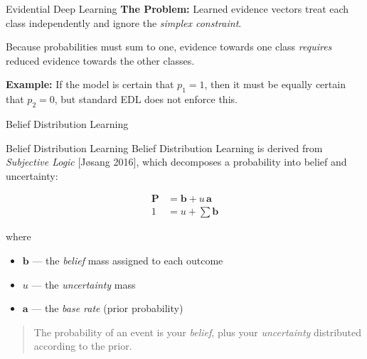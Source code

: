 \documentclass[aspectratio=169]{beamer}
\begin{document}
\begin{frame}[t]{Evidential Deep Learning}
    \textbf{The Problem:} Learned evidence vectors treat each class independently and ignore the \emph{simplex constraint}.
    
    \vspace{2em}
    
    Because probabilities must sum to one, evidence towards one class \emph{requires} reduced evidence towards the other classes.
    
    \vspace{0.5em}
    
    \textbf{Example:} If the model is certain that $p_1 = 1$, then it must be equally certain that $p_2 = 0$, but standard EDL does not enforce this.
\end{frame}

\begin{frame}[T]
    \vfill
    \centering
    {\Large Belief Distribution Learning\par}
    \vfill
\end{frame}


\begin{frame}[t]{Belief Distribution Learning}
    Belief Distribution Learning is derived from \emph{Subjective Logic} [Jøsang 2016], which decomposes a probability into belief and uncertainty:
    
    \begin{align}
        \mathbf{P} &= \mathbf{b} + u\,\mathbf{a} \\
        1 &= u + \sum \mathbf{b}
    \end{align}
    
    \vspace{0.5em}
    
    where
    \begin{itemize}
        \item $\mathbf{b}$ — the \emph{belief} mass assigned to each outcome
        \item $u$ — the \emph{uncertainty} mass
        \item $\mathbf{a}$ — the \emph{base rate} (prior probability)
    \end{itemize}
    
    \vspace{0.5em}
    
    \begin{quote}
        The probability of an event is your \emph{belief}, plus your \emph{uncertainty} distributed according to the prior.
    \end{quote}
\end{frame}
\end{document}
